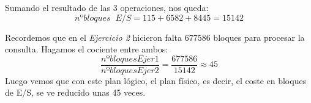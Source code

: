 \documentclass[12pt]{report}
\begin{document}
Sumando el resultado de las 3 operaciones, nos queda:
\[
nºbloques \;\; E/S = 115 + 6582 + 8445 = 15142
\]

Recordemos que en el \textit{Ejercicio 2} hicieron falta $677586$ bloques para procesar la consulta. Hagamos el cociente entre ambos:
\[
\frac{nºbloquesEjer1}{nºbloquesEjer2}=\frac{677586}{15142}\approx 45
\]
Luego vemos que con este plan lógico, el plan físico, es decir, el coste en bloques de E/S, se ve reducido unas 45 veces.
\end{document}
